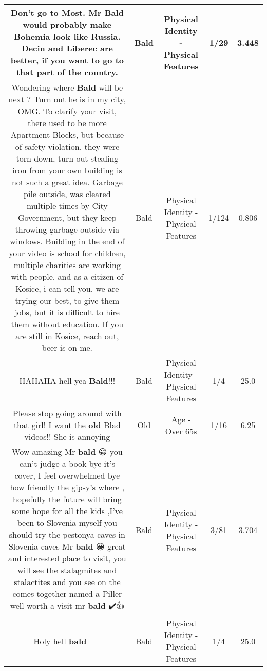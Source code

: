 \documentclass[11pt]{article}
\newlength\mylength
\begin{document}
\begin{center}
\begin{longtable}{|C{.65\mylength}|C{.30\mylength}|C{.12\mylength}|C{.12\mylength}|C{.12\mylength}|}
  \small Don't go to Most. Mr \textbf{Bald} would probably make Bohemia look like Russia. Decin and Liberec are better, if you want to go to that part of the country.\normalsize   & Bald & Physical Identity - Physical Features & 1/29 & 3.448 \\  \hline
  \small Wondering where \textbf{Bald} will be next ? Turn out he is in my city, OMG. To clarify your visit, there used to be more Apartment Blocks, but because of safety violation, they were torn down, turn out stealing iron from your own building is not such a great idea. Garbage pile outside, was cleared multiple times by City Government, but they keep throwing garbage outside via windows. Building in the end of your video is school for children, multiple charities are working with people, and as a citizen of Kosice, i can tell you, we are trying our best, to give them jobs, but it is difficult to hire them without education. If you are still in Kosice, reach out, beer is on me.\normalsize   & Bald & Physical Identity - Physical Features & 1/124 & 0.806 \\  \hline
  \small HAHAHA hell yea \textbf{Bald}!!!\normalsize   & Bald & Physical Identity - Physical Features & 1/4 & 25.0 \\  \hline
  \small Please stop going around with that girl! I want the \textbf{old} Blad videos!! She is annoying\normalsize   & Old & Age - Over 65s & 1/16 & 6.25 \\  \hline
  \small Wow amazing Mr \textbf{bald} 😀 you can't judge a book bye it's cover,  I feel overwhelmed bye how friendly the gipsy's where , hopefully the future will bring some hope for all the kids ,I've been to Slovenia myself you should try the pestonya caves in Slovenia caves Mr \textbf{bald} 😀 great and interested place to visit, you will see the stalagmites and stalactites and you see on the comes together named a Piller well worth a visit mr \textbf{bald} ✔️👍\normalsize   & Bald & Physical Identity - Physical Features & 3/81 & 3.704 \\  \hline
  \small Holy hell \textbf{bald} 👨‍🦲🤣🤣🤣\normalsize   & Bald & Physical Identity - Physical Features & 1/4 & 25.0 \\  \hline

\end{longtable}
\end{center}
\end{document}
